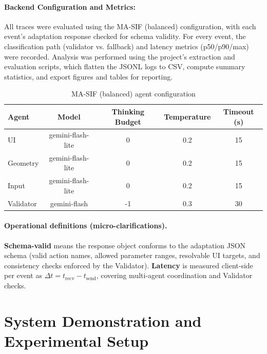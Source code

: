 \documentclass[openany]{book}
\begin{document}
\paragraph{Backend Configuration and Metrics:} 
All traces were evaluated using the MA-SIF (balanced) configuration, with each event’s adaptation response checked for schema validity. For every event, the classification path (validator vs. fallback) and latency metrics (p50/p90/max) were recorded. Analysis was performed using the project’s extraction and evaluation scripts, which flatten the JSONL logs to CSV, compute summary statistics, and export figures and tables for reporting.
\begin{table}[htb]
\centering
\caption{MA-SIF (balanced) agent configuration}
\label{tab:ma-sif-config}
\begin{tabular}{lcccc}
\toprule
\textbf{Agent} & \textbf{Model} & \textbf{Thinking Budget} & \textbf{Temperature} & \textbf{Timeout (s)} \\
\midrule
UI         & gemini-flash-lite & 0   & 0.2 & 15 \\
Geometry   & gemini-flash-lite & 0   & 0.2 & 15 \\
Input      & gemini-flash-lite & 0   & 0.2 & 15 \\
Validator  & gemini-flash      & -1  & 0.3 & 30 \\
\bottomrule
\end{tabular}
\end{table}

\paragraph{Operational definitions (micro-clarifications).}
\textbf{Schema-valid} means the response object conforms to the adaptation JSON schema (valid action names, allowed parameter ranges, resolvable UI targets, and consistency checks enforced by the Validator). 
\textbf{Latency} is measured client-side per event as $\Delta t = t_{\text{recv}} - t_{\text{send}}$, covering multi-agent coordination and Validator checks.

\section{System Demonstration and Experimental Setup}
\end{document}
